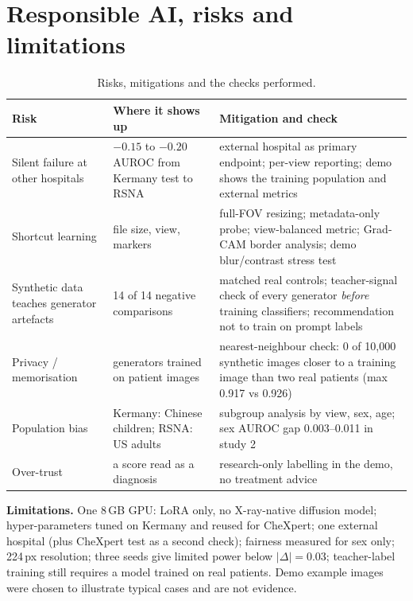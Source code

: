 \documentclass[11pt,a4paper]{article}
\begin{document}
\section{Responsible AI, risks and limitations}
\begin{table}[h]\centering\small
\begin{tabularx}{\textwidth}{lYY}\toprule
Risk & Where it shows up & Mitigation and check\\\midrule
Silent failure at other hospitals & $-0.15$ to $-0.20$ AUROC from Kermany test to RSNA & external hospital as primary endpoint; per-view reporting; demo shows the training population and external metrics\\
Shortcut learning & file size, view, markers & full-FOV resizing; metadata-only probe; view-balanced metric; Grad-CAM border analysis; demo blur/contrast stress test\\
Synthetic data teaches generator artefacts & 14 of 14 negative comparisons & matched real controls; teacher-signal check of every generator \emph{before} training classifiers; recommendation not to train on prompt labels\\
Privacy / memorisation & generators trained on patient images & nearest-neighbour check: 0 of 10{,}000 synthetic images closer to a training image than two real patients (max 0.917 vs 0.926)\\
Population bias & Kermany: Chinese children; RSNA: US adults & subgroup analysis by view, sex, age; sex AUROC gap 0.003--0.011 in study 2\\
Over-trust & a score read as a diagnosis & research-only labelling in the demo, no treatment advice\\\bottomrule
\end{tabularx}
\caption{Risks, mitigations and the checks performed.}
\end{table}
\textbf{Limitations.} One 8\,GB GPU: LoRA only, no X-ray-native diffusion model; hyper-parameters tuned on Kermany and reused for CheXpert; one external hospital (plus CheXpert test as a second check); fairness measured for sex only; 224\,px resolution; three seeds give limited power below $|\Delta|=0.03$; teacher-label training still requires a model trained on real patients. Demo example images were chosen to illustrate typical cases and are not evidence.
\end{document}
